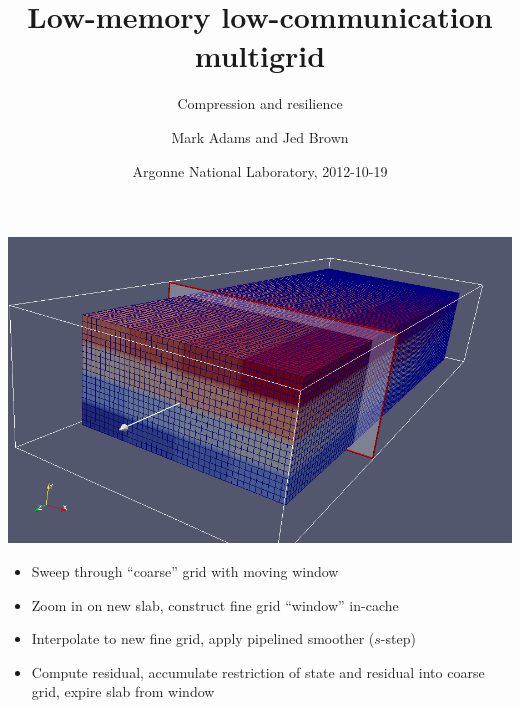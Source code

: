 \documentclass{beamer}
\title{Low-memory low-communication multigrid}
\subtitle{Compression and resilience}
\author{Mark Adams\inst{1} and Jed Brown\inst{2}}
\institute
{
  \inst{1}{Columbia University}
  \inst{2}{Mathematics and Computer Science Division, Argonne National Laboratory} \\
}
\date{Argonne National Laboratory, 2012-10-19}
\begin{document}
\lstset{language=C}
\normalem

\begin{frame}
  \titlepage
\end{frame}

\begin{frame}
  \includegraphics[width=\textwidth]{figures/MGSlice}
  \begin{itemize}
  \item Sweep through ``coarse'' grid with moving window
  \item Zoom in on new slab, construct fine grid ``window'' in-cache
  \item Interpolate to new fine grid, apply pipelined smoother ($s$-step)
  \item Compute residual, accumulate restriction of state and residual into coarse grid, expire slab from window
  \end{itemize}
\end{frame}
\end{document}
